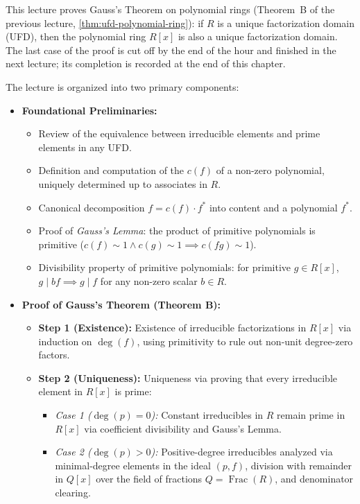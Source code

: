 \begin{overview}
This lecture proves Gauss's Theorem on polynomial rings (Theorem~B of the previous lecture, \cref{thm:ufd-polynomial-ring}): if $R$ is a unique factorization domain (UFD), then the polynomial ring $R[x]$ is also a unique factorization domain. The last case of the proof is cut off by the end of the hour and finished in the next lecture; its completion is recorded at the end of this chapter.

The lecture is organized into two primary components:
\begin{itemize}
    \item \textbf{Foundational Preliminaries:}
    \begin{itemize}
        \item Review of the equivalence between irreducible elements and prime elements in any UFD.
        \item Definition and computation of the  $c(f)$ of a non-zero polynomial, uniquely determined up to associates in $R$.
        \item Canonical decomposition $f = c(f) \cdot f^*$ into content and a  polynomial $f^*$.
        \item Proof of \emph{Gauss's Lemma}: the product of primitive polynomials is primitive ($c(f) \sim 1 \land c(g) \sim 1 \implies c(fg) \sim 1$).
        \item Divisibility property of primitive polynomials: for primitive $g \in R[x]$, $g \mid bf \implies g \mid f$ for any non-zero scalar $b \in R$.
    \end{itemize}
    \item \textbf{Proof of Gauss's Theorem (Theorem B):}
    \begin{itemize}
        \item \textbf{Step 1 (Existence):} Existence of irreducible factorizations in $R[x]$ via induction on $\deg(f)$, using primitivity to rule out non-unit degree-zero factors.
        \item \textbf{Step 2 (Uniqueness):} Uniqueness via proving that every irreducible element in $R[x]$ is prime:
        \begin{itemize}
            \item \emph{Case 1 ($\deg(p) = 0$):} Constant irreducibles in $R$ remain prime in $R[x]$ via coefficient divisibility and Gauss's Lemma.
            \item \emph{Case 2 ($\deg(p) > 0$):} Positive-degree irreducibles analyzed via minimal-degree elements in the ideal $(p, f)$, division with remainder in $Q[x]$ over the field of fractions $Q = \operatorname{Frac}(R)$, and denominator clearing.
        \end{itemize}
    \end{itemize}
\end{itemize}
\end{overview}

